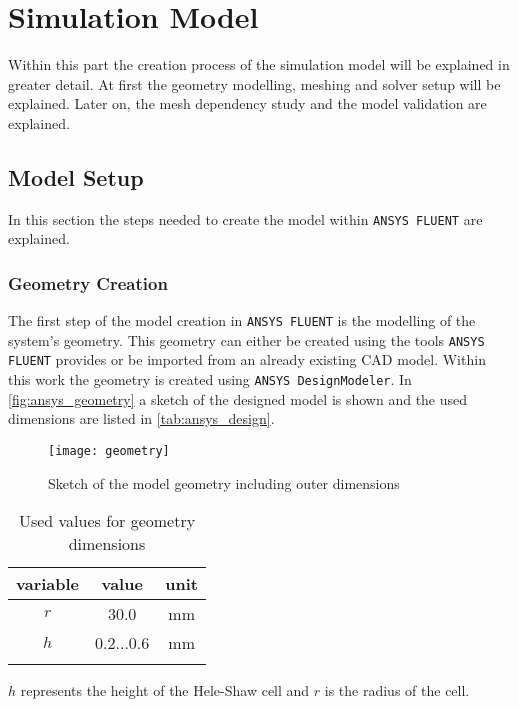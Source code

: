 \documentclass[../thesis.tex]{subfiles}
\begin{document}
\chapter{Simulation Model}
\label{chp:model}

Within this part the creation process of the simulation model will be explained in greater detail. At first the geometry modelling, meshing and solver setup will be explained. Later on, the mesh dependency study and the model validation are explained.

\section{Model Setup}
\label{sec:mod_setup}
In this section the steps needed to create the model within \texttt{ANSYS FLUENT} are explained.

\subsection{Geometry Creation}
The first step of the model creation in \texttt{ANSYS FLUENT} is the modelling of the system's geometry. This geometry can either be created using the tools \texttt{ANSYS FLUENT} provides or be imported from an already existing CAD model. Within this work the geometry is created using \texttt{ANSYS DesignModeler}. In \autoref{fig:ansys_geometry} a sketch of the designed model is shown and the used dimensions are listed in \autoref{tab:ansys_design}.
\begin{figure}[htbp]
	\centering
	\texttt{[image: geometry]}
	\caption{Sketch of the model geometry including outer dimensions}
	\label{fig:ansys_geometry}
\end{figure}
\begin{table} [htb]
	\centering
	\caption{Used values for geometry dimensions}
	\begin{tabular}{ ccc }
		\hline
		variable & value & unit \\
		\hline
		$r$ & 30.0 & mm \\
		$h$ & 0.2...0.6 & mm \\
		\hline
		\label{tab:ansys_design}
	\end{tabular}
\end{table}
$h$ represents the height of the Hele-Shaw cell and $r$ is the radius of the cell.
\end{document}
